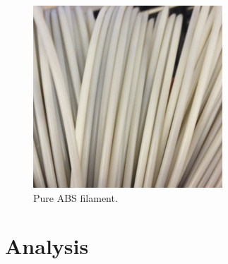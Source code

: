 \begin{figure}[t] %
	\centering
	\includegraphics[scale=1]{Figs3//filament_colour.png}
  \caption[Pure ABS filament]{\footnotesize Pure ABS filament.}
  \label{Fig:filament}
\end{figure}

\section{Analysis}

